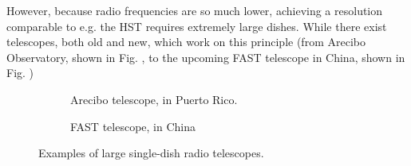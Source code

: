\pg
However, because radio frequencies are so much lower, achieving a resolution comparable to e.g. the HST requires extremely large dishes. While there exist telescopes, both old and new, which work on this principle (from Arecibo Observatory, shown in Fig. , to the upcoming FAST telescope in China, shown in Fig. )

\begin{figure}[h]
\centering
\begin{subfigure}{.43\textwidth}
\caption{\label{fig.arecibo} Arecibo telescope, in Puerto Rico.}
\end{subfigure}
\hfill
\begin{subfigure}{.43\textwidth}
\caption{\label{fig.FAST} FAST telescope, in China}
\end{subfigure}
\caption{\label{fig.singleDishes} Examples of large single-dish radio telescopes.}
\end{figure}

